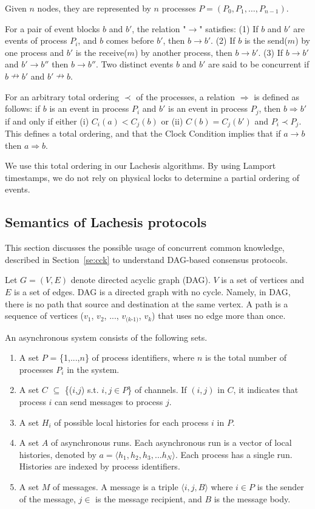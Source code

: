 \documentclass[preprint,12pt]{elsarticle}
\begin{document}
Given $n$ nodes, they are represented by $n$ processes $P = (P_0, P_1, \dots, P_{n-1})$. 

For a pair of event blocks $b$ and $b'$, the relation "$\rightarrow$" satisfies: (1) If $b$ and $b'$ are events of process $P_i$, and $b$ comes before $b'$, then $b \rightarrow b'$. (2) If $b$ is the send($m$) by one process and $b'$ is the receive($m$) by another process, then $b \rightarrow b'$. (3) If $b \rightarrow b'$ and $b' \rightarrow b''$ then $b \rightarrow b''$. 
Two distinct events $b$ and $b'$ are said to be concurrent if $b \nrightarrow b'$ and $b' \nrightarrow b$.

For an arbitrary total ordering $\prec$ of the processes, a relation $\Rightarrow$ is defined as follows: if $b$ is an event in process $P_i$ and $b'$ is an event in process $P_j$, then $b \Rightarrow b'$ if and only if either (i) $C_i(a) < C_j(b)$ or (ii) $C(b)= C_j(b')$ and $P_i \prec P_j$. This defines a total ordering, and that the Clock Condition implies that if $a \rightarrow b$ then $a \Rightarrow b$. 

We use this total ordering in our Lachesis algorithms. 
By using Lamport timestamps, we do not rely on physical locks to determine a partial ordering of events. 

\subsection{Semantics of Lachesis protocols}

This section discusses the possible usage of concurrent common knowledge, described in Section~\ref{se:cck} to understand DAG-based consensus protocols.

Let $G=(V, E)$ denote directed acyclic graph (DAG). $V$ is a set of vertices and $E$ is a set of edges. DAG is a directed graph with no cycle. Namely, in DAG, there is no path that source and destination at the same vertex. 
A path is a sequence of vertices ($v_1$, $v_2$, ..., $v_\textit{(k-1)}$, $v_k$) that uses no edge more than once. 


An asynchronous system consists of the following sets.
\begin{enumerate}
	\item A set $P$ = \{1,...,$n$\} of process identifiers, where $n$ is the total number of processes $P_i$ in the system.
	\item A set $C$ $\subseteq$ \{($i$,$j$) s.t. $i,j \in P$\} of channels. If $(i,j)$ in $C$, it indicates that process $i$ can send messages to process $j$.
	\item A set $H_i$ of possible local histories for each process $i$ in $P$.
	\item A set $A$ of asynchronous runs. Each asynchronous run is a vector of local histories, denoted by $a = \langle h_1,h_2,h_3,...h_N \rangle$. Each process has a single run. Histories are indexed by process identifiers.
	\item A set $M$ of messages. A message is a triple $\langle i,j,B \rangle$ where $i \in P$ is the sender of the message, $j \in $ is the message recipient, and $B$ is the message body.	
\end{enumerate}
\end{document}
